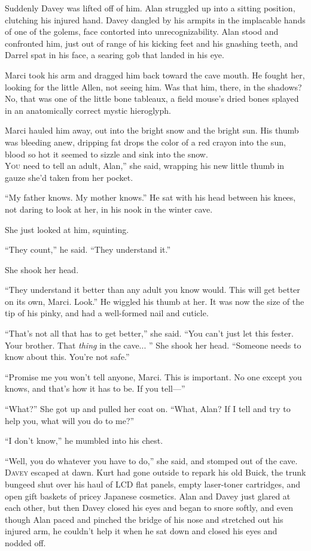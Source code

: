 \documentclass{article}
\begin{document}
Suddenly Davey was lifted off of him.  Alan struggled up into a
sitting position, clutching his injured hand.  Davey dangled by his
armpits in the implacable hands of one of the golems, face contorted
into unrecognizability.  Alan stood and confronted him, just out of
range of his kicking feet and his gnashing teeth, and Darrel spat in
his face, a searing gob that landed in his eye.

Marci took his arm and dragged him back toward the cave mouth.  He
fought her, looking for the little Allen, not seeing him.  Was that
him, there, in the shadows?  No, that was one of the little bone
tableaux, a field mouse's dried bones splayed in an anatomically
correct mystic hieroglyph.

Marci hauled him away, out into the bright snow and the bright sun. 
His thumb was bleeding anew, dripping fat drops the color of a red
crayon into the sun, blood so hot it seemed to sizzle and sink into
the snow.
\\
\lettrine[lines=3, lhang=.5, nindent=0pt, findent=2pt]{Y}{ou}
need to tell an adult, Alan,'' she said, wrapping his new little
thumb in gauze she'd taken from her pocket.

``My father knows.  My mother knows.'' He sat with his head between
his knees, not daring to look at her, in his nook in the winter cave.

She just looked at him, squinting.

``They count,'' he said.  ``They understand it.''

She shook her head.

``They understand it better than any adult you know would.  This will
get better on its own, Marci.  Look.'' He wiggled his thumb at her. 
It was now the size of the tip of his pinky, and had a well-formed
nail and cuticle.

``That's not all that has to get better,'' she said.  ``You can't just
let this fester.  Your brother.  That \textit{thing} in the cave... 
'' She shook her head.  ``Someone needs to know about this.  You're
not safe.''

``Promise me you won't tell anyone, Marci.  This is important.  No one
except you knows, and that's how it has to be.  If you tell---''

``What?'' She got up and pulled her coat on.  ``What, Alan?  If I tell
and try to help you, what will you do to me?''

``I don't know,'' he mumbled into his chest.

``Well, you do whatever you have to do,'' she said, and stomped out of
the cave.
\\
\lettrine[lines=3, lhang=.5, nindent=0pt, findent=2pt]{D}{avey} escaped at dawn.  Kurt had gone outside to repark his old Buick,
the trunk bungeed shut over his haul of LCD flat panels, empty
laser-toner cartridges, and open gift baskets of pricey Japanese
cosmetics.  Alan and Davey just glared at each other, but then Davey
closed his eyes and began to snore softly, and even though Alan paced
and pinched the bridge of his nose and stretched out his injured arm,
he couldn't help it when he sat down and closed his eyes and nodded
off.
\end{document}
